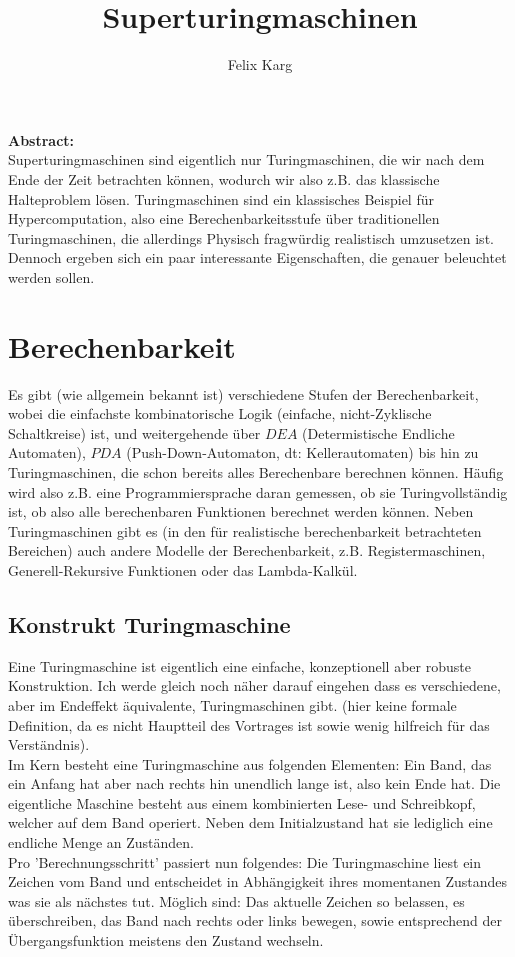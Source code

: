 \documentclass{scrartcl}
\title{Superturingmaschinen}
\author{Felix Karg}
\begin{document}
\maketitle

\textbf{\large {Abstract:} } \\
Superturingmaschinen sind eigentlich nur Turingmaschinen, die wir nach dem Ende
der Zeit betrachten können, wodurch wir also z.B. das klassische Halteproblem
lösen. Turingmaschinen sind ein klassisches Beispiel für Hypercomputation, also
eine Berechenbarkeitsstufe über traditionellen Turingmaschinen, die allerdings
Physisch fragwürdig realistisch umzusetzen ist. Dennoch ergeben sich ein paar
interessante Eigenschaften, die genauer beleuchtet werden sollen.


\section{Berechenbarkeit}
Es gibt (wie allgemein bekannt ist) verschiedene Stufen der Berechenbarkeit,
wobei die einfachste kombinatorische Logik (einfache, nicht-Zyklische
Schaltkreise) ist, und weitergehende über $DEA$ (Determistische Endliche
Automaten), $PDA$ (Push-Down-Automaton, dt: Kellerautomaten)
bis hin zu Turingmaschinen, die schon bereits alles Berechenbare berechnen
können. Häufig wird also z.B. eine Programmiersprache daran gemessen, ob sie
Turingvollständig ist, ob also alle berechenbaren Funktionen berechnet werden
können. Neben Turingmaschinen gibt es (in den für realistische berechenbarkeit
betrachteten Bereichen) auch andere Modelle der Berechenbarkeit, z.B.
Registermaschinen, Generell-Rekursive Funktionen oder das Lambda-Kalkül.


\subsection{Konstrukt Turingmaschine}
Eine Turingmaschine ist eigentlich eine einfache, konzeptionell aber
robuste Konstruktion. Ich werde gleich noch näher darauf eingehen dass es
verschiedene, aber im Endeffekt äquivalente, Turingmaschinen gibt. (hier keine
formale Definition, da es nicht Hauptteil des Vortrages ist sowie wenig
hilfreich für das Verständnis). \\
Im Kern besteht eine Turingmaschine aus folgenden Elementen: Ein Band, das
ein Anfang hat aber nach rechts hin unendlich lange ist, also kein Ende hat.
Die eigentliche Maschine besteht aus einem kombinierten Lese- und Schreibkopf,
welcher auf dem Band operiert. Neben dem Initialzustand hat sie lediglich eine
endliche Menge an Zuständen. \\
Pro 'Berechnungsschritt' passiert nun folgendes: Die Turingmaschine liest ein
Zeichen vom Band und entscheidet in Abhängigkeit ihres momentanen Zustandes was
sie als nächstes tut. Möglich sind: Das aktuelle Zeichen so belassen, es
überschreiben, das Band nach rechts oder links bewegen, sowie entsprechend der
Übergangsfunktion meistens den Zustand wechseln.
\end{document}
